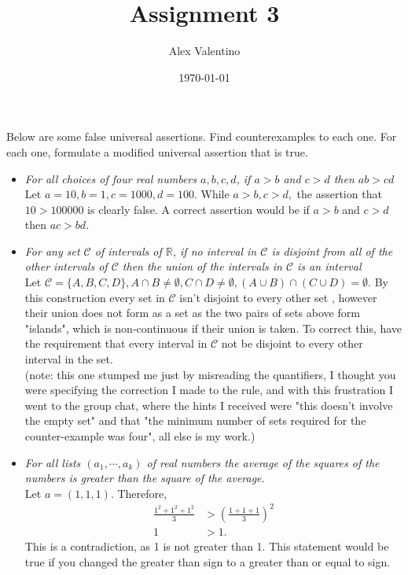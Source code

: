\documentclass[12pt, letterpaper]{article}
\date{\today}
\author{Alex Valentino}
\title{Assignment 3}
\newcommand{\R}{\mathbb{R}}
\begin{document}
	Below are some false universal assertions. Find counterexamples to each one. For each one,
formulate a modified universal assertion that is true.
	\begin{itemize}
		\item \textit{For all choices of four real numbers $a,b,c,d$, if $a > b$ and $c > d$ then $ab > cd$}\\
		Let $a=10, b = 1, c = 1000, d = 100$.  While $a > b, c>d,$ the assertion that $10 > 100000$ is clearly false.  A correct assertion would be  if $a > b$ and $c > d$ then $ac > bd$.
		\item \textit{For any set $\mathcal{C}$ of intervals of $\R$, if no interval in $\mathcal{C}$ is disjoint from all of the other intervals of $\mathcal{C}$ then the union of the intervals in $\mathcal{C}$ is an interval}\\
		Let $\mathcal{C} = \{A,B,C,D\}, A \cap B \neq \emptyset, C \cap D \neq \emptyset, (A \cup B) \cap (C \cup D) = \emptyset.$  By this construction every set in $\mathcal{C}$ isn't disjoint to every other set , however their union does not form as a set as the two pairs of sets above form "islands", which is non-continuous if their union is taken.  To correct this, have the requirement that every interval in $\mathcal{C}$ not be disjoint to every other interval in the set.   \\
		(note: this one stumped me just by misreading the quantifiers, I thought you were specifying the correction I made to the rule, and with this frustration I went to the group chat, where the hints I received were "this doesn't involve the empty set" and that "the minimum number of  sets required for the counter-example was four", all else is my work.)
		\item \textit{For all lists $(a_1, \cdots , a_k)$ of real numbers the average of the squares of the numbers is
greater than the square of the average.}\\
Let $a=(1,1,1)$.  Therefore, \begin{align*}
	\displaystyle \frac{1^2+1^2+1^2}{3} &> (\frac{1+1+1}{3})^2\\
	1 &> 1.
\end{align*}
	This is a contradiction, as 1 is not greater than 1.  This statement would be true if you changed the greater than sign to a greater than or equal to sign.  
	\end{itemize}
\end{document}
